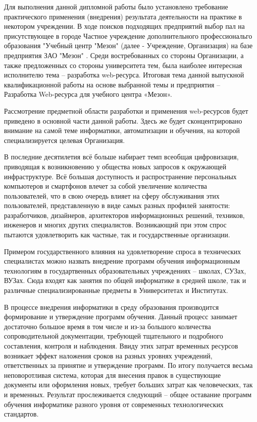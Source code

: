 
Для выполнения данной дипломной работы было установлено требование практического применения (внедрения) результата деятельности на практике в некотором учреждении. В ходе поисков подходящих предприятий выбор пал на присутствующее в городе Частное учреждение дополнительного профессиональго образования "Учебный центр "Мезон" \cite{uc-meson} (далее - Учреждение, Организация) на базе предприятия ЗАО "Мезон" \cite{meson}. Среди востребованных со стороны Организации, а также предложенных со стороны университета тем, была наиболее интересная исполнителю тема -- разработка web-ресурса. Итоговая тема данной выпускной квалификационной работы на основе выбранной темы и предприятия -- Разработка Web-ресурса для учебного центра «Мезон».

Рассмотрение предметной области разработки и применения web-ресурсов будет приведено в основной части данной работы. Здесь же будет сконцентрировано внимание на самой теме информатики, автоматизации и обучения, на которой специализируется целевая Организация.

В последние десятилетия всё больше набирает темп всеобщая цифровизация, приводящая к возникновению у общества новых запросов к окружающей инфраструктуре.
Всё большая доступность и распространение персональных компьютеров и смартфонов влечет за собой увеличение количества пользователей, что в свою очередь влияет на сферу обслуживания этих пользователей, представленную в виде самых разных профилей занятости: разработчиков, дизайнеров, архитекторов информационных решений, техников, инженеров и многих других специалистов.
Возникающий при этом спрос пытаются удовлетворить как частные, так и государственные организации.

Примером государственного влияния на удовлетворение спроса в технических специалистах можно назвать внедрение программ обучения информационным технологиям в государтвенных образовательных учреждениях -- школах, СУЗах, ВУЗах.
Сюда входят как занятия по общей информатике в средней школе, так и различные специализированные предметы в Университетах и Институтах.

В процессе внедрения информатики в среду образования производится формирование и утверждение программ обучения.
Данный процесс занимает достаточно большое время в том числе и из-за большого количества сопроводительной документации, требующей тщательного и подробного составления, контроля и наблюдения.
Ввиду этих затрат временных ресурсов возникает эффект наложения сроков на разных уровнях учреждений, ответственных за принятие и утверждение программ.
По итогу получается весьма неповоротливая система, которая для внесения правок в существующие документы или оформления новых, требует больших затрат как человеческих, так и временных.
Результат прослеживается следующий -- общее оставание программ обучения информатике разного уровня от современных технологических стандартов.

